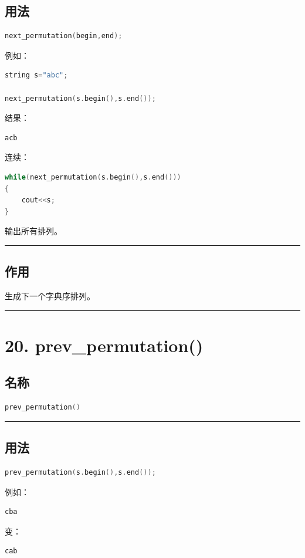 \documentclass[9pt,twocolumn]{extarticle}
\begin{document}
\subsection{用法}
\begin{lstlisting}[language=C++]
next_permutation(begin,end);
\end{lstlisting}
例如：
\begin{lstlisting}[language=C++]
string s="abc";

next_permutation(s.begin(),s.end());
\end{lstlisting}
结果：
\begin{lstlisting}
acb
\end{lstlisting}
连续：
\begin{lstlisting}[language=C++]
while(next_permutation(s.begin(),s.end()))
{
    cout<<s;
}
\end{lstlisting}
输出所有排列。

\noindent\rule{\linewidth}{0.4pt}

\subsection{作用}
生成下一个字典序排列。

\noindent\rule{\linewidth}{0.4pt}

\section{20. prev\_permutation()}

\subsection{名称}
\begin{lstlisting}[language=C++]
prev_permutation()
\end{lstlisting}

\noindent\rule{\linewidth}{0.4pt}

\subsection{用法}
\begin{lstlisting}[language=C++]
prev_permutation(s.begin(),s.end());
\end{lstlisting}
例如：
\begin{lstlisting}
cba
\end{lstlisting}
变：
\begin{lstlisting}
cab
\end{lstlisting}
\end{document}
